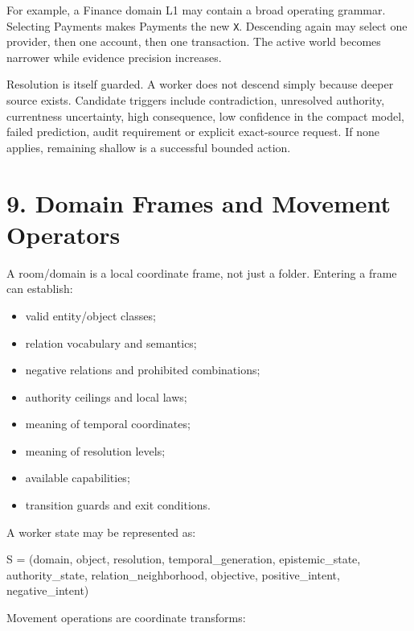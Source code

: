 \documentclass[
  10pt,
  letterpaper,
]{article}
\newenvironment{Shaded}{}{}
\newcommand{\NormalTok}[1]{#1}
\providecommand{\tightlist}{%
  \setlength{\itemsep}{0pt}\setlength{\parskip}{0pt}}
\begin{document}
For example, a Finance domain L1 may contain a broad operating grammar.
Selecting Payments makes Payments the new \nolinkurl{X}. Descending again
may select one provider, then one account, then one transaction. The
active world becomes narrower while evidence precision increases.

Resolution is itself guarded. A worker does not descend simply because
deeper source exists. Candidate triggers include contradiction,
unresolved authority, currentness uncertainty, high consequence, low
confidence in the compact model, failed prediction, audit requirement or
explicit exact-source request. If none applies, remaining shallow is a
successful bounded action.

\section{9. Domain Frames and Movement
Operators}\label{9-domain-frames-and-movement-operators}

A room/domain is a local coordinate frame, not just a folder. Entering a
frame can establish:

\begin{itemize}
\tightlist
\item
  valid entity/object classes;
\item
  relation vocabulary and semantics;
\item
  negative relations and prohibited combinations;
\item
  authority ceilings and local laws;
\item
  meaning of temporal coordinates;
\item
  meaning of resolution levels;
\item
  available capabilities;
\item
  transition guards and exit conditions.
\end{itemize}

A worker state may be represented as:

\begin{Shaded}
\begin{Highlighting}[]
\NormalTok{S = (domain, object, resolution, temporal\_generation,}
\NormalTok{     epistemic\_state, authority\_state, relation\_neighborhood,}
\NormalTok{     objective, positive\_intent, negative\_intent)}
\end{Highlighting}
\end{Shaded}

Movement operations are coordinate transforms:
\end{document}
